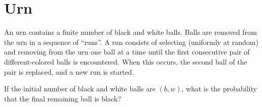 \documentclass[12pt]{article}
\begin{document}
\section{Urn}


\begin{mdframed}
  An urn contains a finite number of black and white balls. Balls are removed from the urn in a
  sequence of ``runs''. A run consists of selecting (uniformly at random) and removing from the urn
  one ball at a time until the first consecutive pair of different-colored balls is
  encountered. When this occurs, the second ball of the pair is replaced, and a new run is started.

  If the initial number of black and white balls are $(b, w)$, what is the probability that the
  final remaining ball is black?
\end{mdframed}


\end{document}
